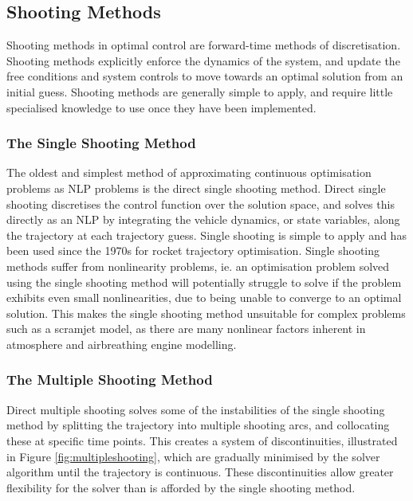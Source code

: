 \subsection{Shooting Methods}

Shooting methods in optimal control are forward-time methods of discretisation\cite{Kelly2015}. Shooting methods explicitly enforce the dynamics of the system, and update the free conditions and system controls to move towards an optimal solution from an initial guess\cite{Kelly2015}. Shooting methods are generally simple to apply, and require little specialised knowledge to use once they have been implemented. 


\subsubsection{The Single Shooting Method}

The oldest and simplest method of approximating continuous optimisation problems as NLP problems is the direct single shooting method. Direct single shooting discretises the control function over the solution space, and solves this directly as an NLP by integrating the vehicle dynamics, or state variables, along the trajectory at each trajectory guess\cite{Betts1998,Kelly2015,Rao2009,Fasano2013}. Single shooting is simple to apply and has been used since the 1970s for rocket trajectory optimisation\cite{jezewski1971}. Single shooting methods suffer from nonlinearity problems, ie. an optimisation problem solved using the single shooting method will potentially struggle to solve if the problem exhibits even small nonlinearities, due to being unable to converge to an optimal solution. This makes the single shooting method unsuitable for complex problems such as a scramjet model, as there are many nonlinear factors inherent in atmosphere and airbreathing engine modelling.

 
\subsubsection{The Multiple Shooting Method}

Direct multiple shooting solves some of the instabilities of the single shooting method by splitting the trajectory into multiple shooting arcs, and collocating these at specific time points\cite{Betts1998,Kelly2015,Rao2009,Fasano2013}. This creates a system of discontinuities, illustrated in Figure \ref{fig:multipleshooting}, which are gradually minimised by the solver algorithm until the trajectory is continuous. These discontinuities allow greater flexibility for the solver than is afforded by the single shooting method. 

